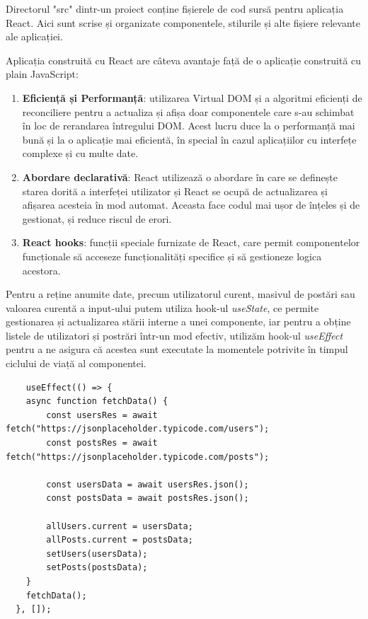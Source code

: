 \documentclass[12pt, a4paper]{report}
\begin{document}
Directorul "src" dintr-un proiect conține fișierele de cod sursă pentru aplicația React. Aici sunt scrise și organizate componentele, stilurile și alte fișiere relevante ale aplicației.

Aplicația construită cu React are câteva avantaje față de o aplicație construită cu plain JavaScript:

\begin{enumerate}
	\item \textbf{Eficiență și Performanță}: utilizarea Virtual DOM și a algoritmi eficienți de reconciliere pentru a actualiza și afișa doar componentele care s-au schimbat în loc de rerandarea întregului DOM. Acest lucru duce la o performanță mai bună și la o aplicație mai eficientă, în special în cazul aplicațiilor cu interfețe complexe și cu multe date.
	\item \textbf{Abordare declarativă}: React utilizează o abordare în care se definește starea dorită a interfeței utilizator și React se ocupă de actualizarea și afișarea acesteia în mod automat. Aceasta face codul mai ușor de înțeles și de gestionat, și reduce riscul de erori.
	\item \textbf{React hooks}:  funcții speciale furnizate de React, care permit componentelor funcționale să acceseze funcționalități specifice și să gestioneze logica acestora.
\end{enumerate}

Pentru a reține anumite date, precum utilizatorul curent, masivul de postări sau valoarea curentă a input-ului putem utiliza hook-ul \emph{useState}, ce permite gestionarea și actualizarea stării interne a unei componente, iar pentru a obține listele de utilizatori și postrări într-un mod efectiv, utilizăm hook-ul \emph{useEffect} pentru a ne asigura că acestea sunt executate la momentele potrivite în timpul ciclului de viață al componentei.

\begin{lstlisting}
	useEffect(() => {
    async function fetchData() {
    	const usersRes = await fetch("https://jsonplaceholder.typicode.com/users");
    	const postsRes = await fetch("https://jsonplaceholder.typicode.com/posts");
      
		const usersData = await usersRes.json();
    	const postsData = await postsRes.json();

    	allUsers.current = usersData;
    	allPosts.current = postsData;
    	setUsers(usersData);
    	setPosts(postsData);
    }
    fetchData();
  }, []);
\end{lstlisting}
\end{document}
